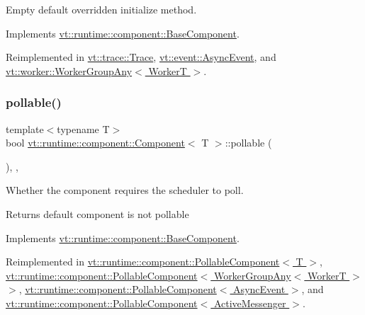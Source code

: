 Empty default overridden initialize method. 



Implements \hyperlink{structvt_1_1runtime_1_1component_1_1_base_component_ae361291ee8a37325580e59fb4030bc3a}{vt\+::runtime\+::component\+::\+Base\+Component}.



Reimplemented in \hyperlink{structvt_1_1trace_1_1_trace_a24019edd964c0a307008f8d6a0f1f825}{vt\+::trace\+::\+Trace}, \hyperlink{structvt_1_1event_1_1_async_event_ac8d9f977b1cca3f43a06d0e83bc88e3d}{vt\+::event\+::\+Async\+Event}, and \hyperlink{structvt_1_1worker_1_1_worker_group_any_ad8bb855b98bf26337ca13df2bff5fb95}{vt\+::worker\+::\+Worker\+Group\+Any$<$ Worker\+T $>$}.

\mbox{\label{structvt_1_1runtime_1_1component_1_1_component_a5a15bd0369a9d3765a6c70249bada96f}} 
\subsubsection{\texorpdfstring{pollable()}{pollable()}}
{\footnotesize\ttfamily template$<$typename T$>$ \\
bool \hyperlink{structvt_1_1runtime_1_1component_1_1_component}{vt\+::runtime\+::component\+::\+Component}$<$ T $>$\+::pollable (\begin{DoxyParamCaption}{ }\end{DoxyParamCaption})\hspace{0.3cm}{\ttfamily [inline]}, {\ttfamily [override]}, {\ttfamily [virtual]}}



Whether the component requires the scheduler to poll. 

\begin{DoxyReturn}{Returns}
default component is not pollable 
\end{DoxyReturn}


Implements \hyperlink{structvt_1_1runtime_1_1component_1_1_base_component_ab651a49e6d4d3d8ca9e82a6b4b10af66}{vt\+::runtime\+::component\+::\+Base\+Component}.



Reimplemented in \hyperlink{structvt_1_1runtime_1_1component_1_1_pollable_component_a8ad6cfbc184ed9862cae5304605fe025}{vt\+::runtime\+::component\+::\+Pollable\+Component$<$ T $>$}, \hyperlink{structvt_1_1runtime_1_1component_1_1_pollable_component_a8ad6cfbc184ed9862cae5304605fe025}{vt\+::runtime\+::component\+::\+Pollable\+Component$<$ Worker\+Group\+Any$<$ Worker\+T $>$ $>$}, \hyperlink{structvt_1_1runtime_1_1component_1_1_pollable_component_a8ad6cfbc184ed9862cae5304605fe025}{vt\+::runtime\+::component\+::\+Pollable\+Component$<$ Async\+Event $>$}, and \hyperlink{structvt_1_1runtime_1_1component_1_1_pollable_component_a8ad6cfbc184ed9862cae5304605fe025}{vt\+::runtime\+::component\+::\+Pollable\+Component$<$ Active\+Messenger $>$}.

